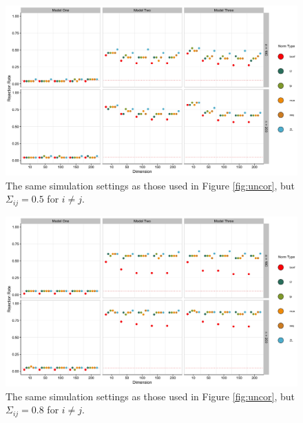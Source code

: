 \documentclass{article}
\begin{document}
\begin{figure}[]
	\centering
\includegraphics[width = \linewidth]{some_core.jpg}
	\caption{The same simulation settings as those used in Figure \ref{fig:uncor}, but $\Sigma_{ij} = 0.5$ for $i \neq j$.}
	\label{fig:somecor}
\end{figure}	

\begin{figure}[]
	\centering
\includegraphics[width = \linewidth]{lots_cor.jpg}
	\caption{The same simulation settings as those used in Figure \ref{fig:uncor}, but $\Sigma_{ij} = 0.8$ for $i \neq j$.}
	\label{fig:lotscor}
\end{figure}

\end{document}
